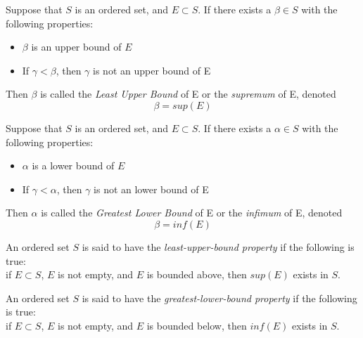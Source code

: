 \documentclass{report}
\begin{document}
		\begin{defn} \label{def_supremum}
			Suppose that $S$ is an ordered set, and $E \subset S$.
			If there exists a $\beta \in S$ with the following properties:
			\begin{itemize}
				\item $\beta$ is an upper bound of $E$
				\item If $\gamma < \beta$, then $\gamma$ is not an upper bound of E
			\end{itemize}
			Then $\beta$ is called the \emph{Least Upper Bound} of E or the \emph{supremum} of E, denoted
			\begin{displaymath}
				\beta=sup(E)
			\end{displaymath}
		\end{defn}

		\begin{defn} \label{def_infimum}
			Suppose that $S$ is an ordered set, and $E \subset S$.
			If there exists a $\alpha \in S$ with the following properties:
			\begin{itemize}
				\item $\alpha$ is a lower bound of $E$
				\item If $\gamma < \alpha$, then $\gamma$ is not an lower bound of E
			\end{itemize}
			Then $\alpha$ is called the \emph{Greatest Lower Bound} of E or the \emph{infimum} of E, denoted
			\begin{displaymath}
			\beta=inf(E)
			\end{displaymath}
		\end{defn}

		\begin{defn} \label{def_least_upper_bound_property}
			An ordered set $S$ is said to have the \emph{least-upper-bound property} if the following is true:\\
			if $E \subset S$, $E$ is not empty, and $E$ is bounded above, then $sup(E)$ exists in $S$.
		\end{defn}

		\begin{defn} \label{def_greatest_lower_bound_property}
			An ordered set $S$ is said to have the \emph{greatest-lower-bound property} if the following is true:\\
			if $E \subset S$, $E$ is not empty, and $E$ is bounded below, then $inf(E)$ exists in $S$.
		\end{defn}
\end{document}
